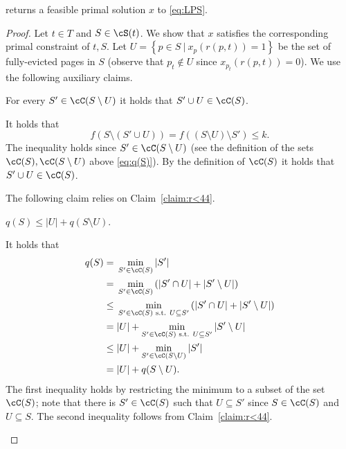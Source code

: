 	\begin{lemma}
	\label{lem:PFeasibleS}
	 returns a feasible primal solution $x$ to \eqref{eq:LPS}. 
\end{lemma}

\begin{proof}
	Let $t \in T$ and $S \in \cS(t)$. We show that $x$ satisfies the corresponding primal constraint of $t,S$. Let $U = \left\{p \in S~|~x_p(r(p,t)) = 1\right\}$ be the set of fully-evicted pages in $S$ (observe that $p_t \notin U$ since $x_{p_t}(r(p,t)) = 0$). We use the following auxiliary claims. 
	
		\begin{claim}
		\label{claim:r<44}
		For every $S' \in \cC(S \setminus U)$ it holds that $S' \cup U \in \cC(S)$.
	\end{claim}
	\begin{claimproof}
		It holds that 
		$$f \left(S \setminus \left(S' \cup U\right)\right) = f \left((S \setminus U) \setminus S'\right) \leq k.$$
		The inequality holds since $S' \in \cC(S \setminus U)$ (see the definition of the sets $\cC(S),\cC(S \setminus U)$ above \eqref{eq:q(S)}). By the definition of $\cC(S)$ it holds that $S' \cup U \in \cC(S)$.
	\end{claimproof}
	The following claim relies on Claim~\ref{claim:r<44}. 
		\begin{claim}
		\label{claim:r<45}
	$q(S) \leq |U|+q(S \setminus U)$. 
	\end{claim}
	\begin{claimproof}
		It holds that 
		\begin{equation*}
			\begin{aligned}
			q(S) ={} & \min_{S' \in \cC(S)} |S'| 
			\\={} & \min_{S' \in \cC(S)} \left( |S' \cap U|+|S' \setminus U| \right) 
			\\\leq{} &  
			\min_{S' \in \cC(S) \text{ s.t. } U \subseteq S'} \left( |S' \cap U|+|S' \setminus U| \right) 
				\\={} &  
				|U|+\min_{S' \in \cC(S) \text{ s.t. } U \subseteq S'}|S' \setminus U| 
					\\\leq{} &  
				|U|+\min_{S' \in \cC(S \setminus U)} |S'| 
					\\={} &  
				|U|+q(S \setminus U). 
			\end{aligned}
		\end{equation*} The first inequality holds by restricting the minimum to a subset of the set $\cC(S)$; note that there is $S' \in \cC(S)$ such that $U \subseteq S'$ since $S \in \cC(S)$ and $U \subseteq S$. The second inequality follows from Claim~\ref{claim:r<44}. 
	\end{claimproof}
	

\end{proof}
